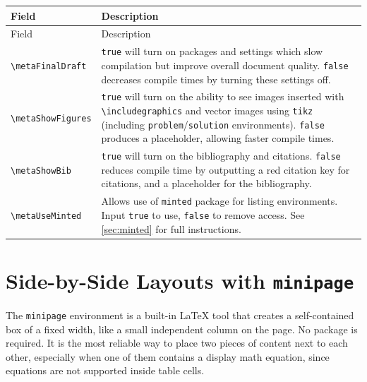 	\begin{tabularx}{\linewidth}{@{}lL@{}}
		\caption{Minted metadata field.}
		\label{tab:meta-minted} \\
		\toprule
		Field & Description \\
		\midrule
		\endfirsthead
		\toprule
		Field & Description \\
		\midrule
		\endhead
		\bottomrule
		\endfoot
		\bottomrule
		\endlastfoot
		\texttt{\textbackslash metaFinalDraft}  
		& \texttt{true} will turn on packages and settings which slow compilation but improve overall document quality. \texttt{false} decreases compile times by turning these settings off. \\
		\addlinespace
		
		\texttt{\textbackslash metaShowFigures}  
		& \texttt{true} will turn on the ability to see images inserted with \texttt{\textbackslash includegraphics} and vector images using \texttt{tikz} (including \texttt{problem}/\texttt{solution} environments). \texttt{false} produces a placeholder, allowing faster compile times. \\
		\addlinespace
		
		\texttt{\textbackslash metaShowBib}  
		& \texttt{true} will turn on the bibliography and citations. \texttt{false} reduces compile time by outputting a red citation key for citations, and a placeholder for the bibliography. \\
		\addlinespace
		
		\texttt{\textbackslash metaUseMinted}  
		& Allows use of \texttt{minted} package for listing environments. Input \texttt{true} to use, \texttt{false} to remove access. See \cref{sec:minted} for full instructions. \\
	\end{tabularx}

\clearpage
\section{Side-by-Side Layouts with \texttt{minipage}}

The \texttt{minipage} environment is a built-in \LaTeX{} tool that creates a self-contained box of a fixed width, like a small independent column on the page. No package is required. It is the most reliable way to place two pieces of content next to each other, especially when one of them contains a display math equation, since equations are not supported inside table cells.

